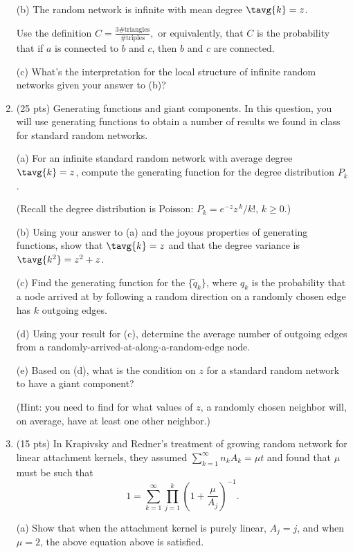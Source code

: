 \begin{enumerate}
  (b) The random network is infinite with mean degree $\tavg{k} = z$.

  Use the definition 
  $C = \frac{3\#\mbox{triangles}}{\#\mbox{triples}},$
  or equivalently, that $C$ is the probability
  that if $a$ is connected to $b$ and $c$, then
  $b$ and $c$ are connected.

  (c) What's the interpretation for the local structure of infinite random networks
  given your answer to (b)?


\item (25 pts) Generating functions and giant components.  In 
  this question, you will use generating functions to obtain
  a number of results we found in class for standard
  random networks.

  (a) For an infinite standard random network with average degree $\tavg{k}=z$,
  compute the generating function for the degree distribution $P_{k}$.

  (Recall the degree distribution is Poisson: $P_{k} = e^{-z} z^{\, k} / k!$, $k \ge 0$.)

  (b) Using your answer to (a) and the joyous properties of 
  generating functions, show that $\tavg{k}=z$ and that
  the degree variance is $\tavg{k^{2}}=z^{2}+z$.

  (c) Find the generating function for the $\{\tilde{q}_{k}\}$, 
  where $q_{k}$ is the probability
  that a node arrived at by following a random direction
  on a randomly chosen edge has $k$ outgoing edges.

  (d) Using your result for (c), determine
  the average number of outgoing edges from a randomly-arrived-at-along-a-random-edge node.

  (e) Based on (d), what is the condition on $z$ for a standard random network
  to have a giant component?

  (Hint: you need to find for what values of $z$,
  a randomly chosen neighbor will, on average, have at least one other
  neighbor.)

\item (15 pts) In Krapivsky and Redner's treatment of
  growing random network for linear attachment kernels,
  they assumed $\sum_{k=1}^{\infty} n_{k} A_{k} = \mu t$ and
  found that $\mu$ must be such that
  $$
  1 = \sum_{k=1}^{\infty} \prod_{j=1}^{k}
  \left(
    1 + \frac{\mu}{A_{j}}
  \right)^{-1}.
  $$
  
  (a) Show that when the attachment kernel is purely linear, $A_{j}=j$,
  and when $\mu=2$, the above equation above is satisfied.


\end{enumerate}

